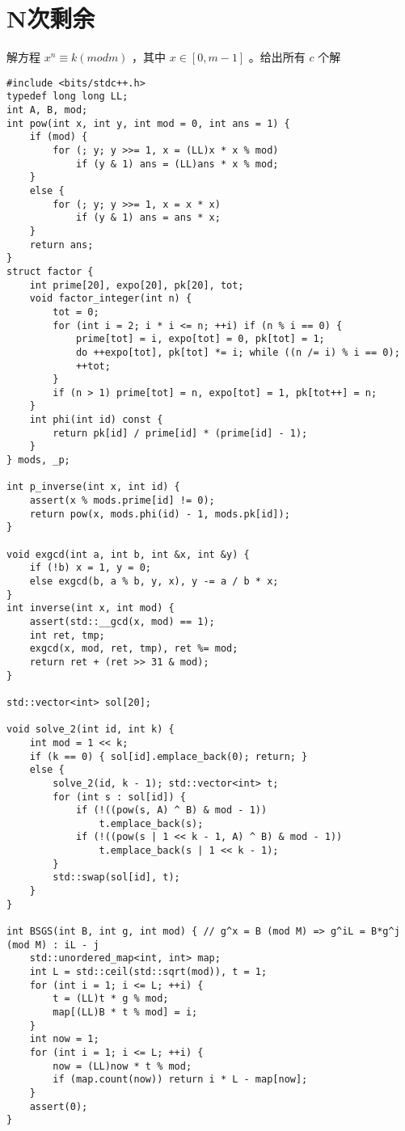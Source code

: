 \section{N次剩余}
\begin{tcolorbox}
解方程 $x^n \equiv k(mod m)$ ，其中 $x\in [0, m−1]$ 。给出所有 $c$ 个解
\end{tcolorbox}
\begin{verbatim}
#include <bits/stdc++.h>
typedef long long LL;
int A, B, mod;
int pow(int x, int y, int mod = 0, int ans = 1) {
    if (mod) {
        for (; y; y >>= 1, x = (LL)x * x % mod)
            if (y & 1) ans = (LL)ans * x % mod;
    }
    else {
        for (; y; y >>= 1, x = x * x)
            if (y & 1) ans = ans * x;
    }
    return ans;
}
struct factor {
    int prime[20], expo[20], pk[20], tot;
    void factor_integer(int n) {
        tot = 0;
        for (int i = 2; i * i <= n; ++i) if (n % i == 0) {
            prime[tot] = i, expo[tot] = 0, pk[tot] = 1;
            do ++expo[tot], pk[tot] *= i; while ((n /= i) % i == 0);
            ++tot;
        }
        if (n > 1) prime[tot] = n, expo[tot] = 1, pk[tot++] = n;
    }
    int phi(int id) const {
        return pk[id] / prime[id] * (prime[id] - 1);
    }
} mods, _p;

int p_inverse(int x, int id) {
    assert(x % mods.prime[id] != 0);
    return pow(x, mods.phi(id) - 1, mods.pk[id]);
}

void exgcd(int a, int b, int &x, int &y) {
    if (!b) x = 1, y = 0;
    else exgcd(b, a % b, y, x), y -= a / b * x;
}
int inverse(int x, int mod) {
    assert(std::__gcd(x, mod) == 1);
    int ret, tmp;
    exgcd(x, mod, ret, tmp), ret %= mod;
    return ret + (ret >> 31 & mod);
}

std::vector<int> sol[20];

void solve_2(int id, int k) {
    int mod = 1 << k;
    if (k == 0) { sol[id].emplace_back(0); return; }
    else {
        solve_2(id, k - 1); std::vector<int> t;
        for (int s : sol[id]) {
            if (!((pow(s, A) ^ B) & mod - 1))
                t.emplace_back(s);
            if (!((pow(s | 1 << k - 1, A) ^ B) & mod - 1))
                t.emplace_back(s | 1 << k - 1);
        }
        std::swap(sol[id], t);
    }
}

int BSGS(int B, int g, int mod) { // g^x = B (mod M) => g^iL = B*g^j (mod M) : iL - j
    std::unordered_map<int, int> map;
    int L = std::ceil(std::sqrt(mod)), t = 1;
    for (int i = 1; i <= L; ++i) {
        t = (LL)t * g % mod;
        map[(LL)B * t % mod] = i;
    }
    int now = 1;
    for (int i = 1; i <= L; ++i) {
        now = (LL)now * t % mod;
        if (map.count(now)) return i * L - map[now];
    }
    assert(0);
}


\end{verbatim}
